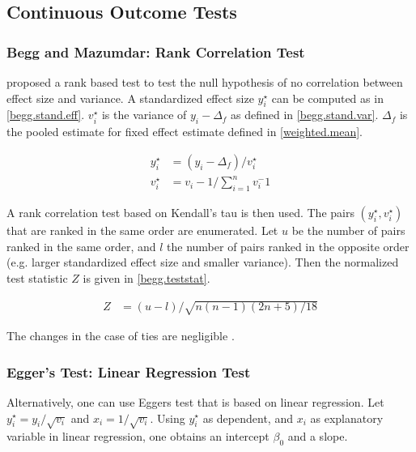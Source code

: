 \documentclass[11pt,a4paper,twoside]{book}\usepackage[]{graphicx}\usepackage[]{color}
\begin{document}
\subsection{Continuous Outcome Tests}

\subsubsection{Begg and Mazumdar: Rank Correlation Test}
\citet{begg.ties} proposed a rank based test to test the null hypothesis of no correlation between effect size and variance.
A standardized effect size $y_{i}^\star$ can be computed as in \ref{begg.stand.eff}. $v_{i}^\star$ is the variance of $y_{i} - \Delta_{f}$ as defined in \ref{begg.stand.var}. $\Delta_{f}$ is the pooled estimate for fixed effect estimate defined in \ref{weighted.mean}. 

\begin{align}
y_{i}^\star &= (y_{i} - \Delta_{f})/v_{i}^\star \label{begg.stand.eff} \\
v_{i}^\star &= v_{i} - 1/\sum_{i = 1}^n v_{i}^-1 \label{begg.stand.var} 
\end{align}

A rank correlation test based on Kendall's tau is then used. The pairs $(y_{i}^\star, v_{i}^\star)$ that are ranked in the same order are enumerated. Let $u$ be the number of pairs ranked in the same order, and $l$ the number of pairs ranked in the opposite order (e.g. larger standardized effect size and smaller variance). Then the normalized test statistic $Z$ is given in \ref{begg.teststat}. 

\begin{align}
Z &= (u - l)/\sqrt{n(n-1)(2n + 5)/18} \label{begg.teststat}
\end{align}

The changes in the case of ties are negligible \cite[410]{begg.ties}.

\subsubsection{Egger's Test: Linear Regression Test}
Alternatively, one can use Eggers test \citep{Egger} that is based on linear regression. Let $y_{i}^\star = y_{i}/\sqrt{v_{i}}$ and $x_{i} = 1/\sqrt{v_{i}}$. 
Using $y_{i}^\star$ as dependent, and  $x_{i}$ as explanatory variable in linear regression, one obtains an intercept $\beta_{0}$ and a slope. 
\end{document}

